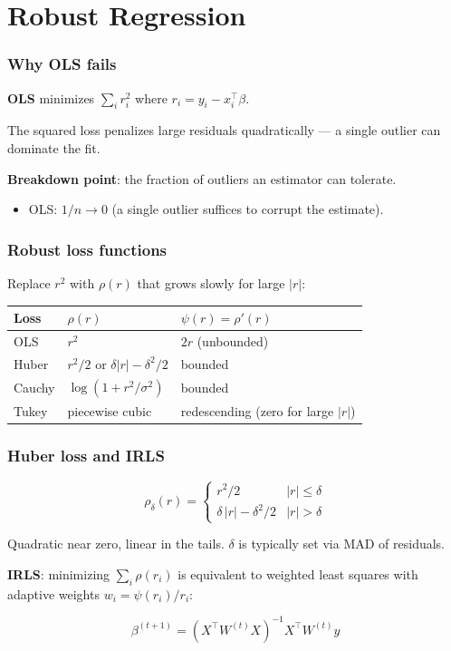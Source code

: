 \documentclass[]{beamer}
\begin{document}
\section{Robust Regression}

\begin{frame}[fragile]
\frametitle{Why OLS fails}
\textbf{OLS} minimizes $\sum_i r_i^2$ where $r_i = y_i - x_i^\top\beta$.

The squared loss penalizes large residuals quadratically --- a single outlier can dominate the fit.

\textbf{Breakdown point}: the fraction of outliers an estimator can tolerate.

\begin{itemize}
  \item OLS: $1/n \to 0$ (a single outlier suffices to corrupt the estimate).
\end{itemize}

\end{frame}

\begin{frame}[fragile]
\frametitle{Robust loss functions}
Replace $r^2$ with $\rho(r)$ that grows slowly for large $|r|$:

\begin{center}
\begin{tabular}{lll}
\toprule
\textbf{Loss} & $\rho(r)$ & $\psi(r) = \rho'(r)$ \\
\midrule
OLS       & $r^2$                           & $2r$ (unbounded) \\
Huber     & $r^2/2$ or $\delta|r|-\delta^2/2$ & bounded \\
Cauchy    & $\log(1 + r^2/\sigma^2)$        & bounded \\
Tukey     & piecewise cubic                 & redescending (zero for large $|r|$) \\
\bottomrule
\end{tabular}
\end{center}

\end{frame}

\begin{frame}[fragile]
\frametitle{Huber loss and IRLS}
\begin{equation*}
\rho_\delta(r) =
\begin{cases}
r^2/2 & |r| \leq \delta \\
\delta\,|r| - \delta^2/2 & |r| > \delta
\end{cases}
\end{equation*}

Quadratic near zero, linear in the tails. $\delta$ is typically set via MAD of residuals.

\textbf{IRLS}: minimizing $\sum_i\rho(r_i)$ is equivalent to weighted least squares with adaptive weights $w_i = \psi(r_i)/r_i$:

\begin{equation*}
\beta^{(t+1)} = \left(X^\top W^{(t)} X\right)^{-1} X^\top W^{(t)} y
\end{equation*}

\end{frame}
\end{document}
